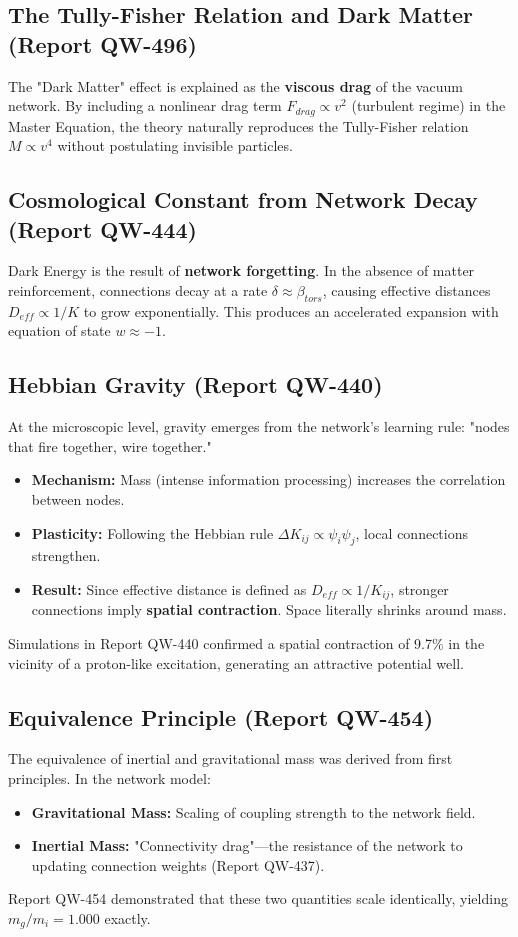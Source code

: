 \documentclass[11pt, a4paper]{article}
\begin{document}
\subsection{The Tully-Fisher Relation and Dark Matter (Report QW-496)}
The "Dark Matter" effect is explained as the \textbf{viscous drag} of the vacuum network. By including a nonlinear drag term $F_{drag} \propto v^2$ (turbulent regime) in the Master Equation, the theory naturally reproduces the Tully-Fisher relation $M \propto v^4$ without postulating invisible particles.

\subsection{Cosmological Constant from Network Decay (Report QW-444)}
Dark Energy is the result of \textbf{network forgetting}. In the absence of matter reinforcement, connections decay at a rate $\delta \approx \beta_{tors}$, causing effective distances $D_{eff} \propto 1/K$ to grow exponentially. This produces an accelerated expansion with equation of state $w \approx -1$.

\subsection{Hebbian Gravity (Report QW-440)}
At the microscopic level, gravity emerges from the network's learning rule: "nodes that fire together, wire together."
\begin{itemize}
    \item \textbf{Mechanism:} Mass (intense information processing) increases the correlation between nodes.
    \item \textbf{Plasticity:} Following the Hebbian rule $\Delta K_{ij} \propto \psi_i \psi_j$, local connections strengthen.
    \item \textbf{Result:} Since effective distance is defined as $D_{eff} \propto 1/K_{ij}$, stronger connections imply \textbf{spatial contraction}. Space literally shrinks around mass.
\end{itemize}
Simulations in Report QW-440 confirmed a spatial contraction of 9.7\% in the vicinity of a proton-like excitation, generating an attractive potential well.

\subsection{Equivalence Principle (Report QW-454)}
The equivalence of inertial and gravitational mass was derived from first principles. In the network model:
\begin{itemize}
    \item \textbf{Gravitational Mass:} Scaling of coupling strength to the network field.
    \item \textbf{Inertial Mass:} "Connectivity drag"—the resistance of the network to updating connection weights (Report QW-437).
\end{itemize}
Report QW-454 demonstrated that these two quantities scale identically, yielding $m_g / m_i = 1.000$ exactly.
\end{document}
